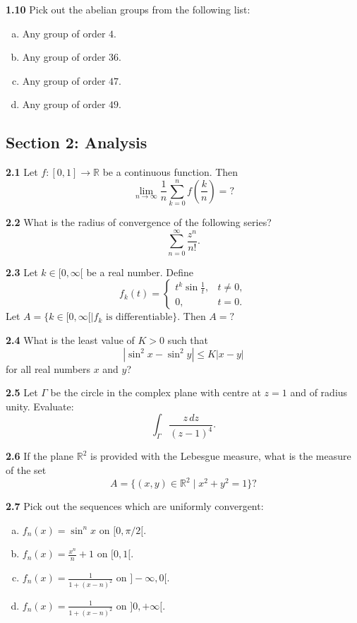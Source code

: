 \documentclass[11pt,a4paper]{article}
\newcommand{\R}{\mathbb{R}}
\newcommand{\examsec}[1]{%
  \subsection*{#1}
  \vspace{-2pt}
}
\newcommand{\qitem}[1]{\par\medskip\noindent\textbf{#1}\hspace{0.5em}}
\begin{document}
\qitem{1.10} Pick out the abelian groups from the following list:
\begin{enumerate}[(a)]
  \item Any group of order $4$.
  \item Any group of order $36$.
  \item Any group of order $47$.
  \item Any group of order $49$.
\end{enumerate}

\examsec{Section 2: Analysis}

\qitem{2.1} Let $f : [0, 1] \to \R$ be a continuous function. Then
\[
  \lim_{n \to \infty} \frac{1}{n} \sum_{k=0}^{n} f\left(\frac{k}{n}\right) = ?
\]

\qitem{2.2} What is the radius of convergence of the following series?
\[
  \sum_{n=0}^{\infty} \frac{z^n}{n!}.
\]

\qitem{2.3} Let $k \in [0, \infty[$ be a real number. Define
\[
  f_k(t) = \begin{cases}
    t^k \sin\frac{1}{t}, & t \neq 0, \\
    0, & t = 0.
  \end{cases}
\]
Let $A = \{k \in [0, \infty[ \mid f_k \text{ is differentiable}\}$. Then $A = ?$

\qitem{2.4} What is the least value of $K > 0$ such that
\[
  |\sin^2 x - \sin^2 y| \le K |x - y|
\]
for all real numbers $x$ and $y$?

\qitem{2.5} Let $\Gamma$ be the circle in the complex plane with centre at $z = 1$ and of radius unity. Evaluate:
\[
  \int_{\Gamma} \frac{z\,dz}{(z - 1)^4}.
\]

\qitem{2.6} If the plane $\R^2$ is provided with the Lebesgue measure, what is the measure of the set
\[
  A = \{(x, y) \in \R^2 \mid x^2 + y^2 = 1\}?
\]

\qitem{2.7} Pick out the sequences which are uniformly convergent:
\begin{enumerate}[(a)]
  \item $f_n(x) = \sin^n x$ on $[0, \pi/2[$.
  \item $f_n(x) = \frac{x^n}{n} + 1$ on $[0, 1[$.
  \item $f_n(x) = \frac{1}{1 + (x - n)^2}$ on $]-\infty, 0[$.
  \item $f_n(x) = \frac{1}{1 + (x - n)^2}$ on $]0, +\infty[$.
\end{enumerate}
\end{document}
